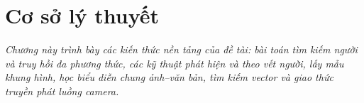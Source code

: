 \chapter{Cơ sở lý thuyết}
\label{chapter:lythuyet}

\textit{Chương này trình bày các kiến thức nền tảng của đề tài: bài toán tìm kiếm người và truy hồi đa phương thức, các kỹ thuật phát hiện và theo vết người, lấy mẫu khung hình, học biểu diễn chung ảnh--văn bản, tìm kiếm vector và giao thức truyền phát luồng camera.}








